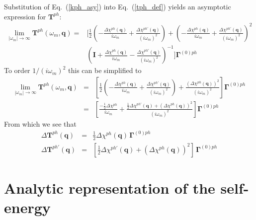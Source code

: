 Substitution of Eq.~(\ref{kph_asy}) into
Eq.~(\ref{tph_def}) yields an asymptotic expression
for $\mathbf{T}^{ph}$:
\begin{equation}
\begin{split}
\lim_{|\omega_m| \to \infty}
\mathbf{T}^{ph}(\omega_m,\mathbf{q})  = &
\bigg[\frac{1}{2}
\left( - \frac{\Delta \chi^{ph}(\mathbf{q})}{i \omega_m}
+ \frac{\Delta \chi^{ph \prime}(\mathbf{q})}{(i \omega_m)^2}\right) 
 + 
\left(- \frac{\Delta \chi^{ph}(\mathbf{q})}{i \omega_m}
+ \frac{\Delta \chi^{ph \prime}(\mathbf{q})}{(i \omega_m)^2}\right)^2 
\\
&
\left(\mathbf{I} + \frac{\Delta \chi^{ph}(\mathbf{q})}{i \omega_m}
- \frac{\Delta \chi^{ph \prime}(\mathbf{q})}{(i \omega_m)^2}\right)^{-1} 
\bigg]
\mathbf{\Gamma}^{(0)ph}
\end{split}
\end{equation}
To order $1/(i\omega_m)^2$ this can be simplified to
\begin{eqnarray}
\lim_{|\omega_m| \to \infty}
\mathbf{T}^{ph}(\omega_m,\mathbf{q})  & = & 
\left[\frac{1}{2}
\left( - \frac{\Delta \chi^{ph}(\mathbf{q})}{i \omega_m}
+ \frac{\Delta \chi^{ph \prime}(\mathbf{q})}{(i \omega_m)^2}\right) 
 + 
\frac{\left(\Delta \chi^{ph}(\mathbf{q})\right)^2}{(i \omega_m)^2}
\right]
\mathbf{\Gamma}^{(0)ph} \\
& = & \left[\frac{ - \frac{1}{2}\Delta \chi^{ph}}{i \omega_m}
+ \frac{ \frac{1}{2} \Delta \chi^{ph \prime}(\mathbf{q}) 
+ \left(\Delta \chi^{ph}(\mathbf{q})\right)^2}{(i\omega_m)^2}
\right] \mathbf{\Gamma}^{(0)ph}
\end{eqnarray}
From which we see that
\begin{eqnarray}
\Delta \mathbf{T}^{ph}(\mathbf{q}) & = &
\frac{1}{2} \Delta \chi^{ph}(\mathbf{q})\,\mathbf{\Gamma}^{(0)ph} \\
\Delta \mathbf{T}^{ph\prime}(\mathbf{q}) & = & \left[
\frac{1}{2} \Delta \chi^{ph \prime}(\mathbf{q}) 
+ \left(\Delta \chi^{ph}(\mathbf{q})\right)^2 \right]\,
\mathbf{\Gamma}^{(0)ph}
\end{eqnarray}

\section{Analytic representation of the self-energy}

